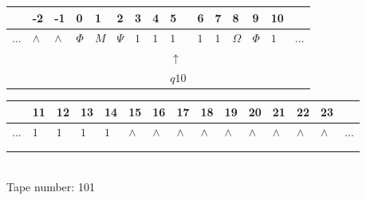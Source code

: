 \documentclass[11pt]{article}
\begin{document}
\begin{table}[H]
\centering
\begin{tabular}{lllllllllllllll}
 & -2 & -1 & 0 & 1 & 2 & 3 & 4 & 5 & 6 & 7 & 8 & 9 & 10 & \\
\hline
$...$ & \multicolumn{1}{|l|}{$\wedge$} & \multicolumn{1}{|l|}{$\wedge$} & \multicolumn{1}{|l|}{$\Phi$} & \multicolumn{1}{|l|}{$M$} & \multicolumn{1}{|l|}{$\Psi$} & \multicolumn{1}{|l|}{$1$} & \multicolumn{1}{|l|}{$1$} & \multicolumn{1}{|l|}{$1$} & \multicolumn{1}{|l|}{$1$} & \multicolumn{1}{|l|}{$1$} & \multicolumn{1}{|l|}{$\Omega$} & \multicolumn{1}{|l|}{$\Phi$} & \multicolumn{1}{|l|}{$1$} & $...$\\
\hline
&  &  &  &  &  &  &  & $\uparrow$ &  &  &  &  &  &  \\
&  &  &  &  &  &  &  & $ q10 $ &  &  &  &  &  &  \\
\end{tabular}
\begin{tabular}{lllllllllllllll}
 & 11 & 12 & 13 & 14 & 15 & 16 & 17 & 18 & 19 & 20 & 21 & 22 & 23 & \\
\hline
$...$ & \multicolumn{1}{|l|}{$1$} & \multicolumn{1}{|l|}{$1$} & \multicolumn{1}{|l|}{$1$} & \multicolumn{1}{|l|}{$1$} & \multicolumn{1}{|l|}{$\wedge$} & \multicolumn{1}{|l|}{$\wedge$} & \multicolumn{1}{|l|}{$\wedge$} & \multicolumn{1}{|l|}{$\wedge$} & \multicolumn{1}{|l|}{$\wedge$} & \multicolumn{1}{|l|}{$\wedge$} & \multicolumn{1}{|l|}{$\wedge$} & \multicolumn{1}{|l|}{$\wedge$} & \multicolumn{1}{|l|}{$\wedge$} & $...$\\
\hline
&  &  &  &  &  &  &  &  &  &  &  &  &  &  \\
&  &  &  &  &  &  &  &  &  &  &  &  &  &  \\
\end{tabular}
\\
Tape number: 101
\noindent\makebox[\linewidth]{\hdashrule{\textwidth}{1pt}{1pt}}\end{table}
\end{document}
